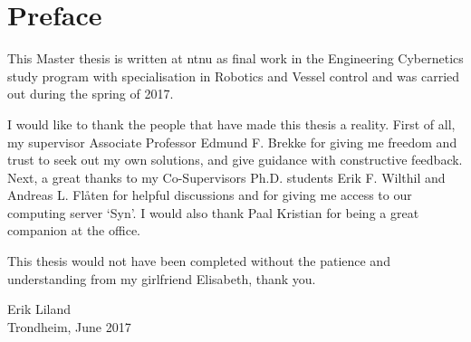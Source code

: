 
\section*{\huge Preface}
\hfill
\noindent 

This Master thesis is written at \gls{ntnu} as final work in the Engineering Cybernetics study program with specialisation in Robotics and Vessel control and was carried out during the spring of 2017.

I would like to thank the people that have made this thesis a reality. First of all, my supervisor Associate Professor Edmund F. Brekke for giving me freedom and trust to seek out my own solutions, and give guidance with constructive feedback. Next, a great thanks to my Co-Supervisors Ph.D. students Erik F. Wilthil and Andreas L. Flåten for helpful discussions and for giving me access to our computing server `Syn'. I would also thank Paal Kristian for being a great companion at the office.

This thesis would not have been completed without the patience and understanding from my girlfriend Elisabeth, thank you.

\vspace{2 cm} 
\begin{center}
Erik Liland \\
Trondheim, June 2017
\end{center}
